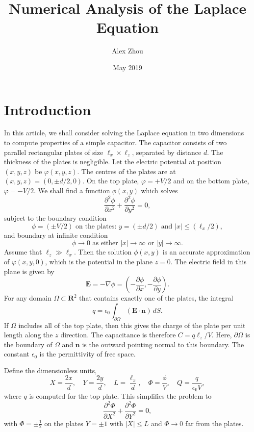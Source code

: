 \documentclass{article}
\title{Numerical Analysis of the Laplace Equation}
\author{Alex Zhou}
\date{May 2019}
\newcommand{\pder}[2][]{\frac{\partial#1}{\partial#2}}
\newcommand{\spder}[2][]{\frac{\partial^2#1}{\partial#2^2}}
\begin{document}
\maketitle

\section{Introduction}

In this article, we shall consider solving the Laplace equation in two dimensions to compute properties of a simple capacitor. The capacitor consists of two parallel rectangular plates of size \(\ell_x \times \ell_z\), separated by distance \(d\). The thickness of the plates is negligible. Let the electric potential at position \((x,y,z)\) be \(\varphi(x,y,z)\). The centres of the plates are at \((x,y,z) = (0,\pm d/2,0)\). On the top plate, \(\varphi = +V/2\) and on the bottom plate, \(\varphi = -V/2\). We shall find a function \(\phi(x,y)\) which solves 
\[ \spder[\phi]{x} + \spder[\phi]{y} = 0, \]
subject to the boundary condition
\[ \phi = (\pm V/2) \mbox{ on the plates: } y = (\pm d/2) \mbox{ and } |x| \leq (\ell_x/2), \]
and boundary at infinite condition
\[ \phi \to 0 \mbox{ as either } |x| \to \infty \mbox{ or } |y| \to \infty. \]
Assume that \(\ell_z \gg \ell_x\). Then the solution \(\phi(x,y)\) is an accurate approximation of \(\varphi(x,y,0)\), which is the potential in the plane \(z = 0\). The electric field in this plane is given by
\[ \mathbf{E} = -\nabla \phi = \left(-\pder[\phi]{x}, -\pder[\phi]{y} \right). \]
For any domain \(\Omega \subset \mathbf{R}^2\) that contains exactly one of the plates, the integral
\[ q = \epsilon_0\int_{\partial \Omega}(\mathbf{E}\cdot\mathbf{n})\,dS. \]
If \(\Omega\) includes all of the top plate, then this gives the charge of the plate per unit length along the \(z\) direction. The capacitance is therefore \(C = q\ell_z/V\). Here, \(\partial \Omega\) is the boundary of \(\Omega\) and \(\mathbf{n}\) is the outward pointing normal to this boundary. The constant \(\epsilon_0\) is the permittivity of free space.

Define the dimensionless units,
\[ X = \frac{2x}{d}, \quad Y = \frac{2y}{d}, \quad L = \frac{\ell_x}{d}, \quad \Phi = \frac{\phi}{V}, \quad Q = \frac{q}{\epsilon_0V}, \]
where \(q\) is computed for the top plate. This simplifies the problem to
\[ \spder[\Phi]{X} + \spder[\Phi]{Y} = 0, \]
with \(\Phi = \pm\frac{1}{2}\) on the plates \(Y = \pm 1\) with \(|X| \leq L\) and \(\Phi \to 0\) far from the plates. 
\end{document}
